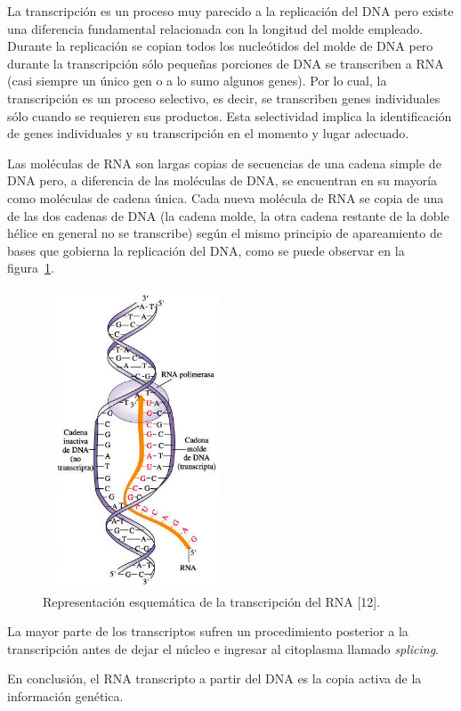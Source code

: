 La transcripción es un proceso muy parecido a la replicación del DNA pero existe una diferencia fundamental relacionada con la longitud del molde empleado. Durante la replicación se copian todos los nucleótidos del molde de DNA pero durante la transcripción sólo pequeñas porciones de DNA se transcriben a RNA (casi siempre un único gen o a lo sumo algunos genes). Por lo cual, la transcripción es un proceso selectivo, es decir, se transcriben genes individuales sólo cuando se requieren sus productos. Esta selectividad implica la identificación de genes individuales y su transcripción en el momento y lugar adecuado.

\par Las moléculas de RNA son largas copias de secuencias de una cadena simple de DNA pero, a diferencia de las moléculas de DNA, se encuentran en su mayoría como moléculas de cadena única. Cada nueva molécula de RNA se copia de una de las dos cadenas de DNA (la cadena molde, la otra cadena restante de la doble hélice en general no se transcribe) según el mismo principio de apareamiento de bases que gobierna la replicación del DNA, como se puede observar en la figura~\ref{transcripcion}. 

\begin{figure} [h]
	\hspace*{3.5cm}\includegraphics[width=2.2209in,height=3.5000in]{image/transcripcion.jpg}
	\caption{Representación esquemática de la transcripción del RNA [12].}
	\label{transcripcion}
\end{figure}				

\par La mayor parte de los transcriptos sufren un procedimiento posterior a la transcripción antes de dejar el núcleo e ingresar al citoplasma llamado \textit{splicing}.
\par En conclusión, el RNA transcripto a partir del DNA es la copia activa de la información genética.


